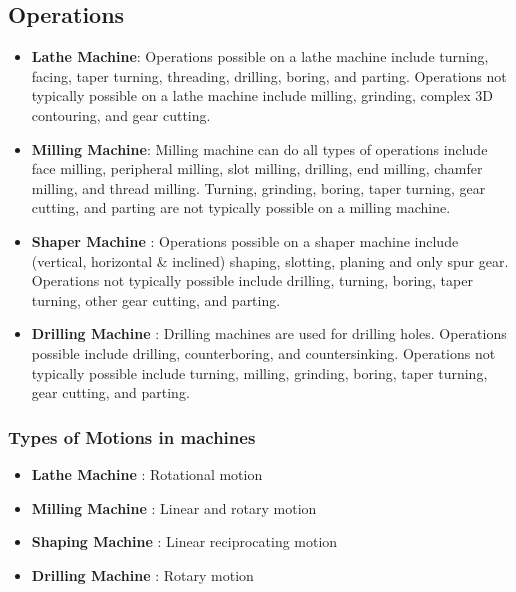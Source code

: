 \documentclass{article}
\begin{document}
\subsection*{Operations}
\begin{itemize}
  \item \textbf{Lathe Machine}: Operations possible on a lathe machine include turning, facing, taper turning, threading, drilling, boring, and parting. Operations not typically possible on a lathe machine include milling, grinding, complex 3D contouring, and gear cutting.
  \item \textbf{Milling Machine}: Milling machine can do all types of operations include face milling, peripheral milling, slot milling, drilling, end milling, chamfer milling, and thread milling. Turning, grinding, boring, taper turning, gear cutting, and parting are not typically possible on a milling machine.
  \item \textbf{Shaper Machine} : Operations possible on a shaper machine include (vertical, horizontal \& inclined) shaping, slotting, planing and only spur gear. Operations not typically possible include drilling, turning, boring, taper turning, other gear cutting, and parting.
  \item \textbf{Drilling Machine} : Drilling machines are used for drilling holes. Operations possible include drilling, counterboring, and countersinking. Operations not typically possible include turning, milling, grinding, boring, taper turning, gear cutting, and parting.
\end{itemize}

\subsubsection*{Types of Motions in machines}
\begin{itemize}
  \item \textbf{Lathe Machine} :  Rotational motion
  \item \textbf{Milling Machine} : Linear and rotary motion
  \item \textbf{Shaping Machine} : Linear reciprocating motion
  \item \textbf{Drilling Machine} : Rotary motion
\end{itemize}
\end{document}

